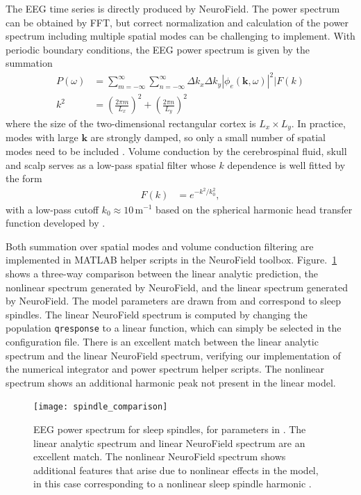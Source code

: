 \documentclass[preprint,review,10pt,authoryear,letterpaper]{elsarticle}
\begin{document}
The EEG time series is directly produced by NeuroField. 
The power spectrum can be obtained by FFT, but correct normalization and calculation of the power spectrum including multiple spatial modes can be challenging to implement. With periodic boundary conditions, the EEG power spectrum is given by the summation
\begin{align}
\label{eqn:power_sum}
P(\omega) &= \sum_{m = -\infty}^{\infty}\sum_{n = -\infty}^{\infty} \Delta k_x \Delta k_y |\phi_e(\mathbf{k},\omega)|^2|F(k)\\
k^2 &=  \left( \frac{2\pi m}{L_x} \right)^2 + \left( \frac{2\pi n}{L_y}\right)^2
\end{align}
where the size of the two-dimensional rectangular cortex is $L_x \times L_y$. In practice, modes with large $\mathbf{k}$ are strongly damped, so only a small number of spatial modes need to be included \citep{OConnor2002}. Volume conduction by the cerebrospinal fluid, skull and scalp serves as a low-pass spatial filter whose $k$ dependence is well fitted by the form \citep{PhysRevE.63.021903,Rowe2004413,alb06a,VanAlbada2010}
\begin{align}
F(k) &= e^{-k^2/k_0^2},
\end{align}
with a low-pass cutoff $k_0 \approx 10$\,m$^{-1}$ based on the spherical harmonic head transfer function developed by \cite{Srinivasan1998}.

Both summation over spatial modes and volume conduction filtering are implemented in MATLAB helper scripts in the NeuroField toolbox. Figure.~\ref{fig:spindle_comparison} shows a three-way comparison between the linear analytic prediction, the nonlinear spectrum generated by NeuroField, and the linear spectrum generated by NeuroField. The model parameters are drawn from \citet{Abeysuriya2013} and correspond to sleep spindles. The linear NeuroField spectrum is computed by changing the population \texttt{qresponse} to a linear function, which can simply be selected in the configuration file. There is an excellent match between the linear analytic spectrum and the linear NeuroField spectrum, verifying our implementation of the numerical integrator and power spectrum helper scripts. The nonlinear spectrum shows an additional harmonic peak not present in the linear model. 

\begin{figure}[!htbp]
\begin{center}
\texttt{[image: spindle\_comparison]}
\caption{EEG power spectrum for sleep spindles, for parameters in \citet{Abeysuriya2013}. The linear analytic spectrum and linear NeuroField spectrum are an excellent match. The nonlinear NeuroField spectrum shows additional features that arise due to nonlinear effects in the model, in this case corresponding to a nonlinear sleep spindle harmonic \citep{Abeysuriya2013a}.}
\label{fig:spindle_comparison}
\end{center}
\end{figure}
\end{document}
